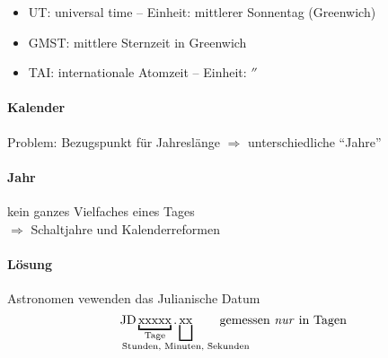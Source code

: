 \begin{itemize}
    \item UT: universal time -- Einheit: mittlerer Sonnentag (Greenwich)
    \item GMST: mittlere Sternzeit in Greenwich
    \item TAI: internationale Atomzeit -- Einheit: $\second$
\end{itemize}

\paragraph{Kalender} Problem: Bezugspunkt für Jahreslänge $\Rightarrow$
    unterschiedliche "`Jahre"'

\paragraph{Jahr} kein ganzes Vielfaches eines Tages\\
$\Rightarrow$ Schaltjahre und Kalenderreformen

\paragraph{Lösung} Astronomen vewenden das Julianische Datum
\[ \text{JD}\underbracket{\text{xxxxx}}_{\text{Tage}}.\underbracket[1pt][1.2em]{\text{xx}}_{\mathclap{\text{Stunden, Minuten, Sekunden}}} \qquad \text{gemessen \emph{nur} in Tagen} \]
